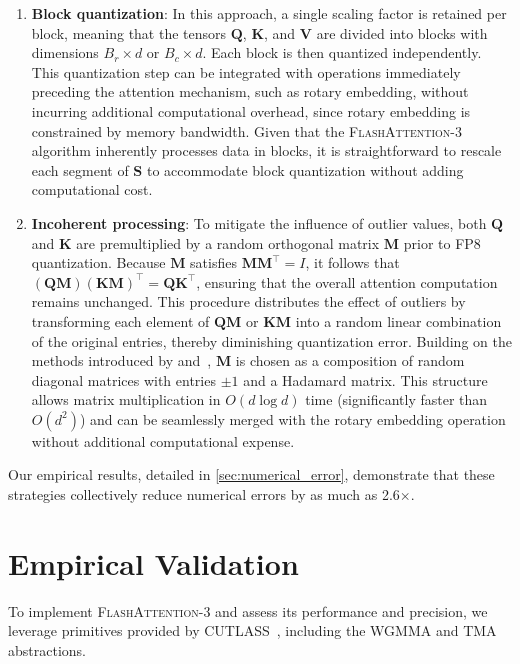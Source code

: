 \begin{enumerate}

\item \textbf{Block quantization}: In this approach, a single scaling factor is retained per block, meaning that the tensors $\mathbf{Q}$, $\mathbf{K}$, and $\mathbf{V}$ are divided into blocks with dimensions $B_r \times d$ or $B_c \times d$. Each block is then quantized independently. This quantization step can be integrated with operations immediately preceding the attention mechanism, such as rotary embedding, without incurring additional computational overhead, since rotary embedding is constrained by memory bandwidth. Given that the \textsc{FlashAttention-3} algorithm inherently processes data in blocks, it is straightforward to rescale each segment of $\mathbf{S}$ to accommodate block quantization without adding computational cost.

\item \textbf{Incoherent processing}: To mitigate the influence of outlier values, both $\mathbf{Q}$ and $\mathbf{K}$ are premultiplied by a random orthogonal matrix $\mathbf{M}$ prior to FP8 quantization. Because $\mathbf{M}$ satisfies $\mathbf{M} \mathbf{M}^\top = I$, it follows that $(\mathbf{Q} \mathbf{M}) (\mathbf{K} \mathbf{M})^\top = \mathbf{Q} \mathbf{K}^\top$, ensuring that the overall attention computation remains unchanged. This procedure distributes the effect of outliers by transforming each element of $\mathbf{Q} \mathbf{M}$ or $\mathbf{K} \mathbf{M}$ into a random linear combination of the original entries, thereby diminishing quantization error. Building on the methods introduced by \citet{chee2024quip} and~\citet{tseng2024quip}, $\mathbf{M}$ is chosen as a composition of random diagonal matrices with entries $\pm 1$ and a Hadamard matrix. This structure allows matrix multiplication in $O(d \log d)$ time (significantly faster than $O(d^2)$) and can be seamlessly merged with the rotary embedding operation without additional computational expense.
\end{enumerate}

Our empirical results, detailed in \cref{sec:numerical_error}, demonstrate that these strategies collectively reduce numerical errors by as much as 2.6$\times$.

\section{Empirical Validation}
\label{sec:exp}

To implement \textsc{FlashAttention-3} and assess its performance and precision, we leverage primitives provided by CUTLASS~\citep{Thakkar_CUTLASS_2023}, including the WGMMA and TMA abstractions.

